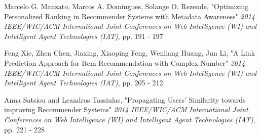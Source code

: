 \documentclass{pracamgr}
\begin{document}
    
\begin{thebibliography}{99}%
   Marcelo G. Manzato, Marcos A. Domingues, Solange O. Rezende,
  "Optimizing Personalized Ranking in Recommender Systems with Metadata Awareness"
  \textit{2014 IEEE/WIC/ACM International Joint Conferences on Web Intelligence (WI) and Intelligent Agent Technologies (IAT)},
  pp. 191 - 197
  
   Feng Xie, Zhen Chen, Jiaxing, Xiaoping Feng, Wenliang Huang, Jun Li,
  "A Link Prediction Approach for Item Recommendation with Complex Number"
  \textit{2014 IEEE/WIC/ACM International Joint Conferences on Web Intelligence (WI) and Intelligent Agent Technologies (IAT)},
  pp. 205 - 212

   Anna Satsiou and Leandros Tassiulas,
  "Propagating Users’ Similarity towards improving Recommender Systems"
  \textit{2014 IEEE/WIC/ACM International Joint Conferences on Web Intelligence (WI) and Intelligent Agent Technologies (IAT)},
  pp. 221 - 228


\end{thebibliography}
\end{document}
